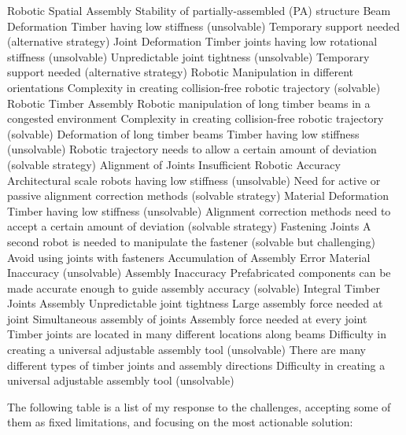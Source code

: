 Robotic Spatial Assembly
Stability of partially-assembled (PA) structure
Beam Deformation
Timber having low stiffness (unsolvable)
Temporary support needed (alternative strategy)
Joint Deformation
Timber joints having low rotational stiffness  (unsolvable)
Unpredictable joint tightness  (unsolvable)
Temporary support needed (alternative strategy)
Robotic Manipulation in different orientations 
Complexity in creating collision-free robotic trajectory (solvable)
Robotic Timber Assembly
Robotic manipulation of long timber beams in a congested environment
Complexity in creating collision-free robotic trajectory (solvable)
Deformation of long timber beams
Timber having low stiffness (unsolvable)
Robotic trajectory needs to allow a certain amount of deviation  (solvable strategy)
Alignment of Joints
Insufficient Robotic Accuracy
Architectural scale robots having low stiffness (unsolvable)
Need for active or passive alignment correction methods (solvable strategy)
Material Deformation
Timber having low stiffness (unsolvable)
Alignment correction methods need to accept a certain amount of deviation (solvable strategy)
Fastening Joints
A second robot is needed to manipulate the fastener (solvable but challenging)
Avoid using joints with fasteners
Accumulation of Assembly Error
Material Inaccuracy (unsolvable)
Assembly Inaccuracy
Prefabricated components can be made accurate enough to guide assembly accuracy (solvable)
Integral Timber Joints Assembly
Unpredictable joint tightness 
Large assembly force needed at joint
Simultaneous assembly of joints
Assembly force needed at every joint
Timber joints are located in many different locations along beams
Difficulty in creating a universal adjustable assembly tool (unsolvable)
There are many different types of timber joints and assembly directions
Difficulty in creating a universal adjustable assembly tool (unsolvable)

The following table is a list of my response to the challenges, accepting some of them as fixed limitations, and focusing on the most actionable solution:

